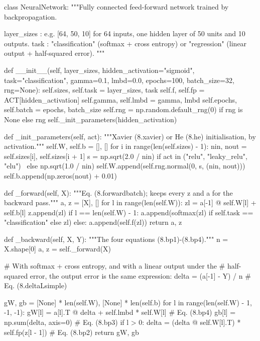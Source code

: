 \begin{Python}{}
class NeuralNetwork:
    """Fully connected feed-forward network trained by backpropagation.

    layer_sizes : e.g. [64, 50, 10] for 64 inputs, one hidden layer of 50
                  units and 10 outputs.
    task        : "classification" (softmax + cross entropy) or
                  "regression" (linear output + half-squared error).
    """

    def __init__(self, layer_sizes, hidden_activation="sigmoid",
                 task="classification", gamma=0.1, lmbd=0.0, epochs=100,
                 batch_size=32, rng=None):
        self.sizes, self.task = layer_sizes, task
        self.f, self.fp = ACT[hidden_activation]
        self.gamma, self.lmbd = gamma, lmbd
        self.epochs, self.batch = epochs, batch_size
        self.rng = np.random.default_rng(0) if rng is None else rng
        self._init_parameters(hidden_activation)

    def _init_parameters(self, act):
        """Xavier (8.xavier) or He (8.he) initialisation, by activation."""
        self.W, self.b = [], []
        for i in range(len(self.sizes) - 1):
            nin, nout = self.sizes[i], self.sizes[i + 1]
            s = np.sqrt(2.0 / nin) if act in ("relu", "leaky_relu", "elu") \
                else np.sqrt(1.0 / nin)
            self.W.append(self.rng.normal(0, s, (nin, nout)))
            self.b.append(np.zeros(nout) + 0.01)

    def _forward(self, X):
        """Eq. (8.forwardbatch); keeps every z and a for the backward pass."""
        a, z = [X], []
        for l in range(len(self.W)):
            zl = a[-1] @ self.W[l] + self.b[l]
            z.append(zl)
            if l == len(self.W) - 1:
                a.append(softmax(zl) if self.task == "classification" else zl)
            else:
                a.append(self.f(zl))
        return a, z

    def _backward(self, X, Y):
        """The four equations (8.bp1)-(8.bp4)."""
        n = X.shape[0]
        a, z = self._forward(X)

        # With softmax + cross entropy, and with a linear output under the
        # half-squared error, the output error is the same expression:
        delta = (a[-1] - Y) / n                       # Eq. (8.deltaLsimple)

        gW, gb = [None] * len(self.W), [None] * len(self.b)
        for l in range(len(self.W) - 1, -1, -1):
            gW[l] = a[l].T @ delta + self.lmbd * self.W[l]   # Eq. (8.bp4)
            gb[l] = np.sum(delta, axis=0)                    # Eq. (8.bp3)
            if l > 0:
                delta = (delta @ self.W[l].T) * self.fp(z[l - 1])  # Eq. (8.bp2)
        return gW, gb


\end{Python}
